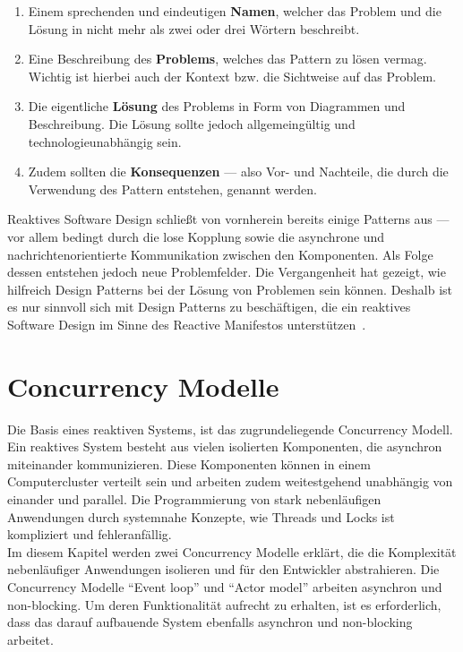 \begin{enumerate}
\item Einem sprechenden und eindeutigen \textbf{Namen}, welcher das Problem und die Lösung in nicht mehr als zwei oder drei Wörtern beschreibt.
\item Eine Beschreibung des \textbf{Problems}, welches das Pattern zu lösen vermag. Wichtig ist hierbei auch der Kontext bzw. die Sichtweise auf das Problem.
\item Die eigentliche \textbf{Lösung} des Problems in Form von Diagrammen und Beschreibung. Die Lösung sollte jedoch allgemeingültig und technologieunabhängig sein.
\item Zudem sollten die \textbf{Konsequenzen} --- also Vor- und Nachteile, die durch die Verwendung des Pattern entstehen, genannt werden.
\end{enumerate}

Reaktives Software Design schließt von vornherein bereits einige Patterns aus --- vor allem bedingt durch die lose Kopplung sowie die asynchrone und nachrichtenorientierte Kommunikation zwischen den Komponenten. Als Folge dessen entstehen jedoch neue Problemfelder. Die Vergangenheit hat gezeigt, wie hilfreich Design Patterns bei der Lösung von Problemen sein können. Deshalb ist es nur sinnvoll sich mit Design Patterns zu beschäftigen, die ein reaktives Software Design im Sinne des Reactive Manifestos unterstützen~\cite[S.~54]{kuhn_reactive_2015}.

\pagebreak

\section{Concurrency Modelle}

Die Basis eines reaktiven Systems, ist das zugrundeliegende Concurrency Modell. Ein reaktives System besteht aus vielen isolierten Komponenten, die asynchron miteinander kommunizieren. Diese Komponenten können in einem Computercluster verteilt sein und arbeiten zudem weitestgehend unabhängig von einander und parallel. Die Programmierung von stark nebenläufigen Anwendungen durch systemnahe Konzepte, wie Threads und Locks ist kompliziert und fehleranfällig.\\
Im diesem Kapitel werden zwei Concurrency Modelle erklärt, die die Komplexität nebenläufiger Anwendungen isolieren und für den Entwickler abstrahieren. Die Concurrency Modelle \enquote{Event loop} und \enquote{Actor model} arbeiten asynchron und non-blocking. Um deren Funktionalität aufrecht zu erhalten, ist es erforderlich, dass das darauf aufbauende System ebenfalls asynchron und non-blocking arbeitet.

